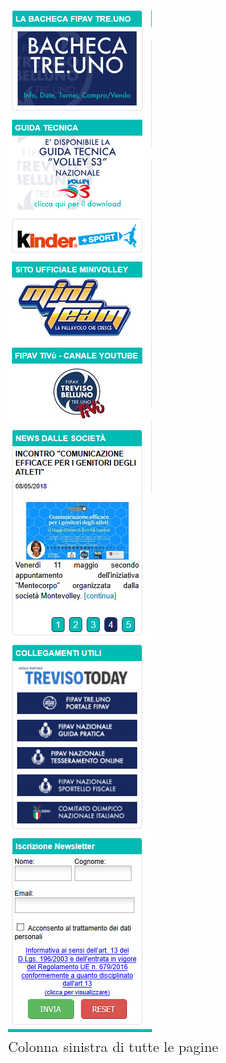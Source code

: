 	\begin{figure}[H]
	\centering
	\includegraphics[scale=0.6]{Images/struttura.png}
	\caption{Colonna sinistra di tutte le pagine}
	\end{figure}
	
